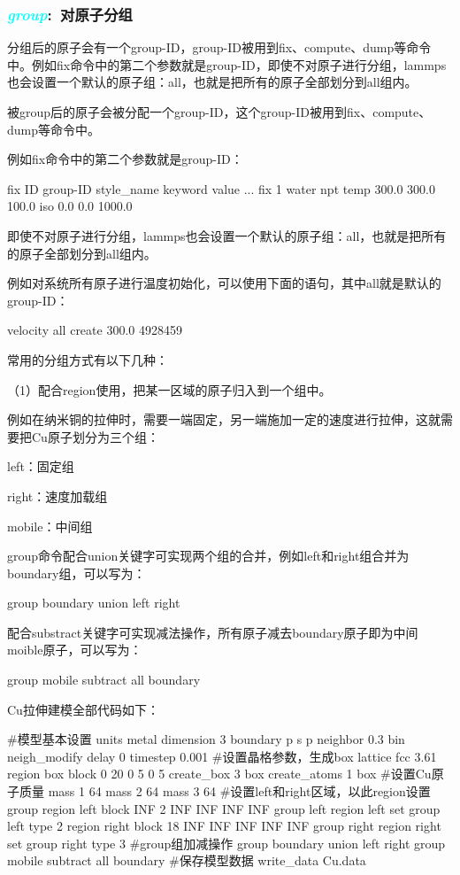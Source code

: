 \frame
{
	\frametitle{\textcolor{cyan}{\textit{group}}:~对原子分组}
	分组后的原子会有一个group-ID，group-ID被用到fix、compute、dump等命令中。例如fix命令中的第二个参数就是group-ID，即使不对原子进行分组，lammps也会设置一个默认的原子组：all，也就是把所有的原子全部划分到all组内。

	被group后的原子会被分配一个group-ID，这个group-ID被用到fix、compute、dump等命令中。

例如fix命令中的第二个参数就是group-ID：

fix ID group-ID style_name keyword value ...
fix 1 water npt temp 300.0 300.0 100.0 iso 0.0 0.0 1000.0

即使不对原子进行分组，lammps也会设置一个默认的原子组：all，也就是把所有的原子全部划分到all组内。

例如对系统所有原子进行温度初始化，可以使用下面的语句，其中all就是默认的group-ID：

velocity all create 300.0 4928459

常用的分组方式有以下几种：

（1）配合region使用，把某一区域的原子归入到一个组中。

例如在纳米铜的拉伸时，需要一端固定，另一端施加一定的速度进行拉伸，这就需要把Cu原子划分为三个组：

left：固定组

right：速度加载组

mobile：中间组

group命令配合union关键字可实现两个组的合并，例如left和right组合并为boundary组，可以写为：

group     boundary union left right

配合substract关键字可实现减法操作，所有原子减去boundary原子即为中间moible原子，可以写为：

group     mobile subtract all boundary

Cu拉伸建模全部代码如下：

#模型基本设置
units               metal
dimension           3
boundary            p s p
neighbor            0.3 bin
neigh_modify        delay 0
timestep            0.001
#设置晶格参数，生成box
lattice             fcc 3.61
region              box block 0 20 0 5 0 5
create_box          3 box
create_atoms        1 box
#设置Cu原子质量
mass		    1 64
mass		    2 64
mass		    3 64
#设置left和right区域，以此region设置group
region              left block INF 2 INF INF INF INF
group               left region left
set		    group left type 2
region              right block 18 INF INF INF INF INF
group               right region right
set		    group right type 3
#group组加减操作
group               boundary union left right
group               mobile subtract all boundary
#保存模型数据
write_data	    Cu.data

}

